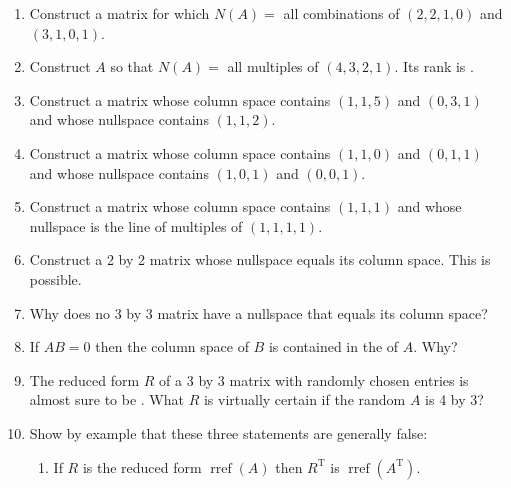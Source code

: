 \documentclass[14pt, a4paper]{article}
\begin{document}
\begin{enumerate}[resume]
    \item Construct a matrix for which $N(A) =$ all combinations of $(2, 2, 1, 0)$ and $(3, 1, 0, 1)$.

    \item Construct $A$ so that $N(A) =$ all multiples of $(4, 3, 2, 1)$. Its rank is \underline{\hspace{2cm}}.

    \item Construct a matrix whose column space contains $(1, 1, 5)$ and $(0, 3, 1)$ and whose nullspace contains $(1, 1, 2)$.

    \item Construct a matrix whose column space contains $(1, 1, 0)$ and $(0, 1, 1)$ and whose nullspace contains $(1, 0, 1)$ and $(0, 0, 1)$.

    \item Construct a matrix whose column space contains $(1, 1, 1)$ and whose nullspace is the line of multiples of $(1, 1, 1, 1)$.

    \item Construct a 2 by 2 matrix whose nullspace equals its column space. This is possible.

    \item Why does no 3 by 3 matrix have a nullspace that equals its column space?

    \item If $AB = 0$ then the column space of $B$ is contained in the \underline{\hspace{2cm}} of $A$. Why?

    \item The reduced form $R$ of a 3 by 3 matrix with randomly chosen entries is almost sure to be \underline{\hspace{2cm}}. What $R$ is virtually certain if the random $A$ is 4 by 3?

    \item Show by example that these three statements are generally false:
          \begin{enumerate}
              \item If $R$ is the reduced form $\operatorname{rref}(A)$ then $R^{\mathrm{T}}$ is $\operatorname{rref}(A^{\mathrm{T}})$.
          \end{enumerate}


\end{enumerate}
\end{document}
